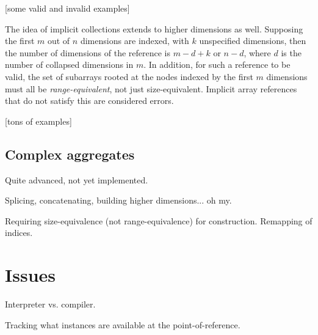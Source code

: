 [some valid and invalid examples]

The idea of implicit collections extends to higher dimensions as well.  
Supposing the first $m$ out of $n$ dimensions are indexed, 
with $k$ unspecified dimensions, then the number of dimensions of the 
reference is $m-d+k$ or $n-d$,
where $d$ is the number of collapsed dimensions in $m$.  
In addition, for such a reference to be valid, 
the set of subarrays rooted at the nodes indexed by the 
first $m$ dimensions must all be \emph{range-equivalent}, 
not just size-equivalent.  
Implicit array references that do not satisfy this are considered errors.  

[tons of examples]

\subsection{Complex aggregates}
\label{sec:arrays:references:aggregate}

Quite advanced, not yet implemented.  

Splicing, concatenating, building higher dimensions... oh my.  

Requiring size-equivalence (not range-equivalence) for construction.
Remapping of indices.  

\section{Issues}
\label{sec:arrays:issues}

Interpreter vs. compiler.

Tracking what instances are available at the point-of-reference.  


